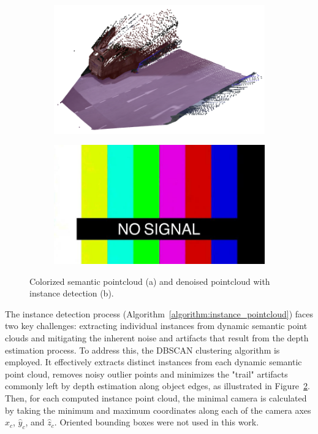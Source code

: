 \begin{figure}[h!]
    \centering
    \begin{subfigure}[b]{0.45\textwidth}
        \includegraphics[width=\linewidth]{images/methodology/pcd_semantic.png}
        \caption{}
        \label{fig:semantic_pointcloud_a}
    \end{subfigure}
    \hfill
    \begin{subfigure}[b]{0.45\textwidth}
        \includegraphics[width=\textwidth]{images/shared/no_signal.jpg}
        \caption{}
        \label{fig:semantic_pointcloud_b}
    \end{subfigure}

    \caption{Colorized semantic pointcloud (a) and denoised pointcloud with instance detection (b).}
    \label{fig:semantic_pointcloud}
\end{figure}

The instance detection process (Algorithm~\ref{algorithm:instance_pointcloud}) faces two key challenges: extracting individual instances from dynamic semantic point clouds and mitigating the inherent noise and artifacts that result from the depth estimation process. To address this, the DBSCAN clustering algorithm is employed. It effectively extracts distinct instances from each dynamic semantic point cloud, removes noisy outlier points and minimizes the "trail" artifacts commonly left by depth estimation along object edges, as illustrated in Figure~\ref{fig:semantic_pointcloud_b}. Then, for each computed instance point cloud, the minimal camera  is calculated by taking the minimum and maximum coordinates along each of the camera axes $\hat{x}_c$, $\hat{y}_c$, and $\hat{z}_c$. Oriented bounding boxes were not used in this work.

